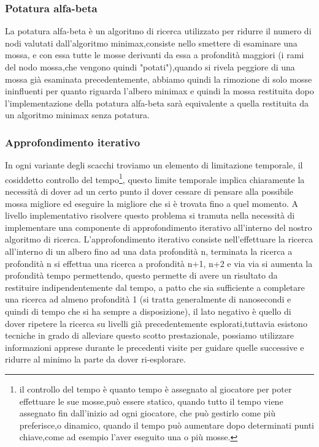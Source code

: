 \subsubsection{Potatura alfa-beta}
La potatura alfa-beta è un algoritmo di ricerca utilizzato per ridurre il numero di nodi valutati dall'algoritmo 
minimax,consiste nello smettere di esaminare una mossa, e con essa tutte le mosse derivanti da essa a profondità maggiori
(i rami del nodo mossa,che vengono quindi "potati"),quando si rivela peggiore di una mossa già esaminata precedentemente,
abbiamo quindi la rimozione di solo mosse ininfluenti per quanto riguarda l'albero minimax e quindi la mossa
restituita dopo l'implementazione della potatura alfa-beta sarà equivalente a quella restituita da un algoritmo
minimax senza potatura.

\subsubsection{Approfondimento iterativo}
In ogni variante degli scacchi troviamo un elemento di limitazione temporale, il cosiddetto controllo del tempo\footnote{il controllo del tempo è quanto tempo è assegnato al giocatore
per poter effettuare le sue mosse,può essere statico, quando tutto il tempo viene assegnato fin dall'inizio ad ogni giocatore, che può gestirlo come più preferisce,o dinamico, 
quando il tempo può aumentare dopo determinati punti chiave,come ad esempio l'aver eseguito una o più mosse.},
questo limite temporale implica chiaramente la necessità di dover ad un certo punto il dover cessare di pensare alla 
possibile mossa migliore ed eseguire la migliore che si è trovata fino a quel momento.
A livello implementativo risolvere questo problema si tramuta nella necessità di implementare una componente di approfondimento
iterativo all'interno del nostro algoritmo di ricerca.
L'approfondimento iterativo consiste nell'effettuare la ricerca all'interno di un albero fino ad una data profondità n,
terminata la ricerca a profondità n si effettua una ricerca a profondità n+1, n+2 e via via si aumenta la profondità tempo permettendo,
questo permette di avere un risultato da restituire indipendentemente dal tempo, a patto che sia sufficiente a completare una 
ricerca ad almeno profondità 1 (si tratta generalmente di nanosecondi e quindi di tempo che si ha sempre a disposizione), il lato negativo
è quello di dover ripetere la ricerca su livelli già precedentemente esplorati,tuttavia esistono tecniche in grado di alleviare questo scotto prestazionale,
possiamo utilizzare informazioni apprese durante le precedenti visite per guidare quelle successive e ridurre al minimo la parte da dover ri-esplorare.
